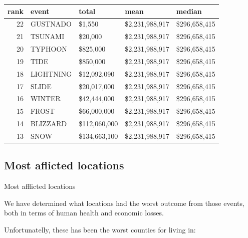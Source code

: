 \documentclass[]{article}
\newenvironment{Shaded}{\begin{snugshade}}{\end{snugshade}}
\newcommand{\KeywordTok}[1]{\textcolor[rgb]{0.13,0.29,0.53}{\textbf{{#1}}}}
\newcommand{\DataTypeTok}[1]{\textcolor[rgb]{0.13,0.29,0.53}{{#1}}}
\newcommand{\DecValTok}[1]{\textcolor[rgb]{0.00,0.00,0.81}{{#1}}}
\newcommand{\StringTok}[1]{\textcolor[rgb]{0.31,0.60,0.02}{{#1}}}
\newcommand{\CommentTok}[1]{\textcolor[rgb]{0.56,0.35,0.01}{\textit{{#1}}}}
\newcommand{\OtherTok}[1]{\textcolor[rgb]{0.56,0.35,0.01}{{#1}}}
\newcommand{\NormalTok}[1]{{#1}}
\begin{document}
\begin{longtable}[]{@{}rllll@{}}
\toprule
rank & event & total & mean & median\tabularnewline
\midrule
\endhead
22 & GUSTNADO & \$1,550 & \$2,231,988,917 & \$296,658,415\tabularnewline
21 & TSUNAMI & \$20,000 & \$2,231,988,917 & \$296,658,415\tabularnewline
20 & TYPHOON & \$825,000 & \$2,231,988,917 &
\$296,658,415\tabularnewline
19 & TIDE & \$850,000 & \$2,231,988,917 & \$296,658,415\tabularnewline
18 & LIGHTNING & \$12,092,090 & \$2,231,988,917 &
\$296,658,415\tabularnewline
17 & SLIDE & \$20,017,000 & \$2,231,988,917 &
\$296,658,415\tabularnewline
16 & WINTER & \$42,444,000 & \$2,231,988,917 &
\$296,658,415\tabularnewline
15 & FROST & \$66,000,000 & \$2,231,988,917 &
\$296,658,415\tabularnewline
14 & BLIZZARD & \$112,060,000 & \$2,231,988,917 &
\$296,658,415\tabularnewline
13 & SNOW & \$134,663,100 & \$2,231,988,917 &
\$296,658,415\tabularnewline
\bottomrule
\end{longtable}

\subsection{Most aflicted locations}\label{most-aflicted-locations}

Most afflicted locations

We have determined what locations had the worst outcome from those
events, both in terms of human health and economic losses.

Unfortunatelly, these has been the worst counties for living in:

\begin{Shaded}
\end{Shaded}
\end{document}
